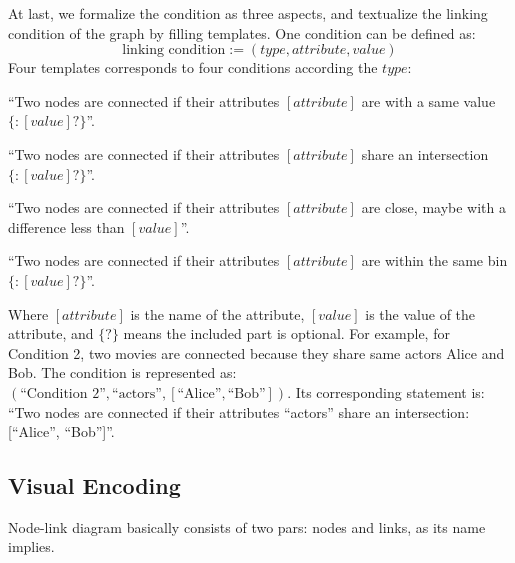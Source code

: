 At last, we formalize the condition as three aspects, and textualize the linking condition of the graph by filling templates. 
{\color{text-hightlight}One condition can be defined as:}
\begin{equation}
    \text{linking condition} := ( type, attribute, value )
\end{equation}
Four templates corresponds to four conditions according the $type$:

\begin{compactenum}
    \item ``Two nodes are connected if their attributes $[{attribute}]$ are with a same value$\{: [{value}]?\}$''.
    \item ``Two nodes are connected if their attributes $[{attribute}]$ share an intersection$\{: [{value}]?\}$''.
    \item ``Two nodes are connected if their attributes $[{attribute}]$ are close, maybe with a difference less than $[{value}]$''.
    \item ``Two nodes are connected if their attributes $[{attribute}]$ are within the same bin$\{: [{value}]?\}$''.
\end{compactenum}

{\color{text-hightlight}Where $[{attribute}]$ is the name of the attribute, $[{value}]$ is the value of the attribute, and $\{?\}$ means the included part is optional. For example, for Condition 2, two movies are connected because they share same actors Alice and Bob. The condition is represented as: $(\text{``Condition 2''}, \text{``actors''}, [\text{``Alice''}, \text{``Bob''}])$. Its corresponding statement is: ``Two nodes are connected if their attributes ``actors'' share an intersection: [``Alice'', ``Bob'']''.}

\subsection{Visual Encoding}

Node-link diagram basically consists of two pars: nodes and links, as its name implies.






